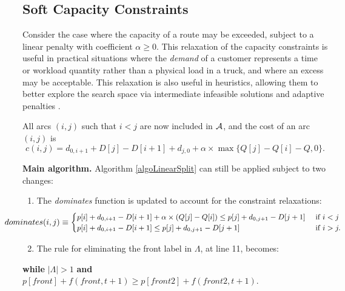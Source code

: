 \documentclass[11pt]{article}
\newcommand{\cA}{{\cal A}}
\begin{document}
\subsection{Soft Capacity Constraints}
\label{sectionLinearSoft}

Consider the case where the capacity of a route may be exceeded, subject to a linear penalty with coefficient $\alpha \geq 0$. This relaxation of the capacity constraints is useful in practical situations where the \emph{demand} of a customer represents a time or workload quantity rather than a physical load in a truck, and where an excess may be acceptable. This relaxation is also useful in heuristics, allowing them to better explore the search space via intermediate infeasible solutions and adaptive penalties \citep{Gendreau1994,Cordeau1997,Vidal2013a}.

All arcs $(i,j)$ such that $i < j$ are now included in $\cA$, and the cost of an arc $(i,j)$ is
\begin{equation}
c(i,j) = d_{0,i+1} + D[j] - D[i+1] + d_{j,0} + \alpha \times \max \{ Q[j] - Q[i] - Q , 0 \}.
\end{equation}

\noindent
\textbf{Main algorithm.}
Algorithm \ref{algoLinearSplit} can still be applied subject to two changes:
\begin{enumerate}
\item The \emph{dominates} function is updated to account for the constraint relaxations:
\begin{equation}
\hspace*{-1.4cm}
\begin{small}
dominates(i,j) \equiv
\begin{cases}
p[i] + d_{0,i+1} - D[i+1] + \alpha \times (Q[j] - Q[i]) \leq p[j] + d_{0,j+1} - D[j+1]   & \text{ if } i < j \\
p[i] + d_{0,i+1}  - D[i+1] \leq  p[j] + d_{0,j+1} - D[j+1] & \text{ if } i > j. \\
\end{cases} 
\end{small}
\label{dominatesFunctionSoft}
\end{equation}
\item The rule for eliminating the front label in $\Lambda$, at line 11, becomes:
\end{enumerate}

\begin{center}
\textbf{while} $|\Lambda| > 1$  \textbf{and} $p[front] + f(front,t+1) \geq  p[front2] + f(front2,t+1)$. \\ \vspace*{0.3cm}
\end{center}
\end{document}
